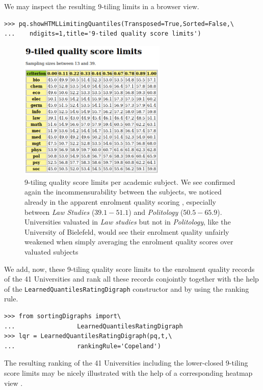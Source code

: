 We may inspect the resulting 9-tiling limits in a browser view.

\begin{lstlisting}
>>> pq.showHTMLLimitingQuantiles(Transposed=True,Sorted=False,\
...	   ndigits=1,title='9-tiled quality score limits')
\end{lstlisting}

\begin{figure}[h]
\sidecaption
\includegraphics[width=7cm]{Figures/score9Limits.png}
\caption{9-tiling quality score limits per academic subject. We see confirmed again the incommensurability between the subjects, we noticed already in the apparent enrolment quality scoring , especially between \emph{Law Studies} ($39.1 - 51.1$) and \emph{Politology} ($50.5 - 65.9$). Universities valuated in \emph{Law studies} but not in \emph{Politology}, like the University of Bielefeld, would see their enrolment quality unfairly weakened when simply averaging the enrolment quality scores over valuated subjects}
\label{fig:14.3}       %
\end{figure}
We add, now, these 9-tiling quality score limits to the enrolment quality records of the 41 Universities and rank all these records conjointly together with the help of the \texttt{LearnedQuantilesRatingDigraph} constructor and by using the \Copeland ranking rule.

\begin{lstlisting}
>>> from sortingDigraphs import\
...                 LearnedQuantilesRatingDigraph
>>> lqr = LearnedQuantilesRatingDigraph(pq,t,\
...                 rankingRule='Copeland')
\end{lstlisting}

The resulting ranking of the 41 Universities including the lower-closed 9-tiling score limits may be nicely illustrated  with the help of a corresponding heatmap view . 

